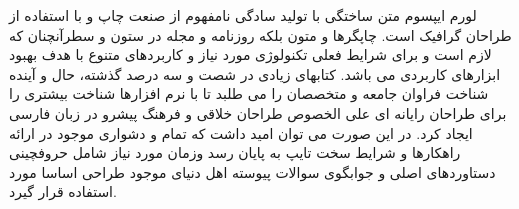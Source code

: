 لورم ایپسوم متن ساختگی با تولید سادگی نامفهوم از صنعت چاپ و با استفاده از طراحان گرافیک است. چاپگرها و متون بلکه روزنامه و مجله در ستون و سطرآنچنان که لازم است و برای شرایط فعلی تکنولوژی مورد نیاز و کاربردهای متنوع با هدف بهبود ابزارهای کاربردی می باشد. کتابهای زیادی در شصت و سه درصد گذشته، حال و آینده شناخت فراوان جامعه و متخصصان را می طلبد تا با نرم افزارها شناخت بیشتری را برای طراحان رایانه ای علی الخصوص طراحان خلاقی و فرهنگ پیشرو در زبان فارسی ایجاد کرد. در این صورت می توان امید داشت که تمام و دشواری موجود در ارائه راهکارها و شرایط سخت تایپ به پایان رسد وزمان مورد نیاز شامل حروفچینی دستاوردهای اصلی و جوابگوی سوالات پیوسته اهل دنیای موجود طراحی اساسا مورد استفاده قرار گیرد.
